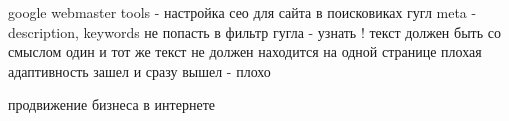 google webmaster tools - настройка сео для сайта в поисковиках гугл
meta - description, keywords
не попасть в фильтр гугла  - узнать ! 
текст должен быть со смыслом 
один и тот же текст не должен находится на одной странице
плохая адаптивность 
зашел и сразу вышел - плохо 

продвижение бизнеса в интернете
